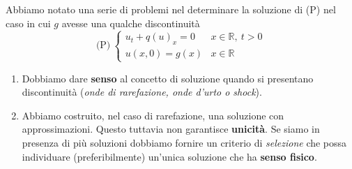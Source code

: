 \documentclass[10pt,a4paper,twoside,openright]{book}
\begin{document}
Abbiamo notato una serie di problemi nel determinare la soluzione di (P) nel caso in cui $g$ avesse una qualche discontinuità
\begin{equation}
	\text{(P)} \ 
	\begin{cases}
		u_{t} +q( u)_{x} =0 & x\in \mathbb{R} ,\ t >0 \\
		u( x,0) =g( x)      & x\in \mathbb{R}         
	\end{cases}
\end{equation}
\begin{enumerate}
	\item Dobbiamo dare \textbf{senso} al concetto di soluzione quando si presentano discontinuità (\textit{onde di rarefazione, onde d'urto o shock}).
	\item Abbiamo costruito, nel caso di rarefazione, una soluzione con approssimazioni. Questo tuttavia non garantisce \textbf{unicità}. Se siamo in presenza di più soluzioni dobbiamo fornire un criterio di \textit{selezione} che possa individuare (preferibilmente) un'unica soluzione che ha \textbf{senso fisico}.
\end{enumerate}
\end{document}
